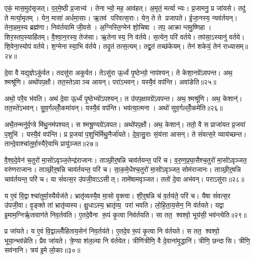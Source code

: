एकं॒ मास॒मुद॑सृजत्। प॒र॒मे॒ष्ठी प्र॒जाभ्य॑। तेनाभ्यो॒ मह॒ आव॑हत्। अ॒मृतं॒ मर्त्याभ्यः। प्र॒जामनु॒ प्र जा॑यसे। तदु॑ ते मर्त्या॒मृतम्। येन॒ मासा॑ अर्धमा॒साः। ऋ॒तव॑ परिवत्स॒राः। येन॒ ते ते प्रजापते। ई॒जा॒नस्य॒ न्यव॑र्तयन्। तेना॒हम॒स्य ब्रह्म॑णा। निव॑र्तयामि जी॒वसे। अ॒ग्निस्ति॒ग्मेन॑ शो॒चिषा। तप॒ आक्रान्तमु॒ष्णिहा। शिर॒स्तप॒स्याहि॑तम्। वै॒श्वा॒न॒रस्य॒ तेज॑सा। ऋ॒तेनास्य॒ नि व॑र्तये। स॒त्येन॒ परि॑ वर्तये। तप॑सा॒ऽस्यानु॑ वर्तये। शि॒वेना॒स्योप॑ वर्तये। श॒ग्मेनास्या॒भि व॑र्तये। तदृ॒तं तत्स॒त्यम्। तद्व्र॒तं तच्छ॑केयम्। तेन॑ शकेयं॒ तेन॑ राध्यासम्॥२४॥

दे॒वा वै यद्य॒ज्ञेऽकु॑र्वत। तदसु॑रा अकुर्वत। तेऽसु॑रा ऊ॒र्ध्वं पृ॒ष्ठेभ्यो॒ नाप॑श्यन्। ते केशा॒नग्रे॑ऽवपन्त। अथ॒ श्मश्रू॑णि। अथो॑पप॒क्षौ। तत॒स्तेऽवाञ्च आयन्। परा॑ऽभवन्। यस्यै॒वं वप॑न्ति। अवा॑ङेति॥२५॥

अथो॒ परै॒व भ॑वति। अथ॑ दे॒वा ऊ॒र्ध्वं पृ॒ष्ठेभ्यो॑ऽपश्यन्। त उ॑पप॒क्षावग्रे॑ऽवपन्त। अथ॒ श्मश्रू॑णि। अथ॒ केशान्॑। तत॒स्ते॑ऽभवन्। सु॒व॒र्गल्लोँ॒कमा॑यन्। यस्यै॒वं वप॑न्ति। भव॑त्या॒त्मना। अथो॑ सुव॒र्गल्लोँ॒कमे॑ति॥२६॥

अथै॒तन्मनु॑र्व॒प्त्रे मि॑थु॒नम॑पश्यत्। स श्मश्रू॒ण्यग्रे॑ऽवपत। अथो॑पप॒क्षौ। अथ॒ केशान्॑। ततो॒ वै स प्राजा॑यत प्र॒जया॑ प॒शुभि॑। यस्यै॒वं वप॑न्ति। प्र प्र॒जया॑ प॒शुभि॑र्मिथु॒नैर्जा॑यते। दे॒वा॒सु॒राः सं॒य॑त्ता आसन्। ते सं॑वत्स॒रे व्याय॑च्छन्त। तान्दे॒वाश्चा॑तुर्मा॒स्यैरे॒वाभि प्रायु॑ञ्जत॥२७॥

वै॒श्व॒दे॒वेन॑ च॒तुरो॑ मा॒सो॑ऽवृञ्ज॒तेन्द्र॑राजानः। ताञ्छी॒र्॒षन्नि चाव॑र्तयन्त॒ परि॑ च। व॒रु॒ण॒प्र॒घा॒सैश्च॒तुरो॑ मा॒सो॑ऽवृञ्जत॒ वरु॑णराजानः। ताञ्छी॒र्॒षन्नि चाव॑र्तयन्त॒ परि॑ च। सा॒क॒मे॒धैश्च॒तुरो॑ मा॒सो॑ऽवृञ्जत॒ सोम॑राजानः। ताञ्छी॒र्॒षन्नि चाव॑र्तयन्त॒ परि॑ च। या सं॑वत्स॒र उ॑पजी॒वाऽऽसीत्। तामे॑षामवृञ्जत। ततो॑ दे॒वा अभ॑वन्। पराऽसु॑राः॥२८॥

य ए॒वं वि॒द्वाश्चा॑तुर्मा॒स्यैर्यज॑ते। भ्रातृ॑व्यस्यै॒व मा॒सो वृ॒क्त्वा। शी॒र्॒षन्नि च॑ व॒र्तय॑ते॒ परि॑ च। यैषा सं॑वत्स॒र उ॑पजी॒वा। वृ॒ङ्क्ते तां भ्रातृ॑व्यस्य। क्षु॒धाऽस्य॒ भ्रातृ॑व्य॒ परा॑ भवति। लो॒हि॒ता॒य॒सेन॒ नि व॑र्तयते। यद्वा इ॒माम॒ग्निर्\mbox{}ऋ॒तावाग॑ते निव॒र्तय॑ति। ए॒तदे॒वैना रू॒पं कृ॒त्वा निव॑र्तयति। सा तत॒ श्वश्वो॒ भूय॑सी॒ भव॑न्त्येति॥२९॥

प्र जा॑यते। य ए॒वं वि॒द्वाल्लोँ॑हिताय॒सेन॑ निव॒र्तय॑ते। ए॒तदे॒व रू॒पं कृ॒त्वा नि व॑र्तयते। स तत॒ श्वश्वो॒ भूया॒न्भव॑न्नेति। प्रैव जा॑यते। त्रे॒ण्या श॑ल॒ल्या नि व॑र्तयेत। त्रीणि॑त्रीणि॒ वै दे॒वाना॑मृ॒द्धानि॑। त्रीणि॒ छन्दासि। त्रीणि॒ सव॑नानि। त्रय॑ इ॒मे लो॒काः॥३०॥

